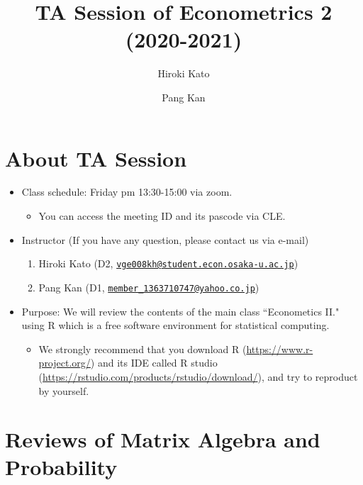 \documentclass[
  12pt,
]{article}
\title{TA Session of Econometrics 2 (2020-2021)}
\author{Hiroki Kato \and Pang Kan}
\date{}
\providecommand{\tightlist}{%
  \setlength{\itemsep}{0pt}\setlength{\parskip}{0pt}}
\begin{document}
\maketitle

{
\setcounter{tocdepth}{2}
\tableofcontents
}
\hypertarget{about-ta-session}{%
\section{About TA Session}\label{about-ta-session}}

\begin{itemize}
\tightlist
\item
  Class schedule: Friday pm 13:30-15:00 via zoom.

  \begin{itemize}
  \tightlist
  \item
    You can access the meeting ID and its pascode via CLE.
  \end{itemize}
\item
  Instructor (If you have any question, please contact us via e-mail)

  \begin{enumerate}
  \def\labelenumi{\arabic{enumi}.}
  \tightlist
  \item
    Hiroki Kato (D2, \href{mailto:vge008kh@student.econ.osaka-u.ac.jp}{\nolinkurl{vge008kh@student.econ.osaka-u.ac.jp}})
  \item
    Pang Kan (D1, \href{mailto:member_1363710747@yahoo.co.jp}{\nolinkurl{member\_1363710747@yahoo.co.jp}})
  \end{enumerate}
\item
  Purpose: We will review the contents of the main class ``Econometics II." using R which is a free software environment for statistical computing.

  \begin{itemize}
  \tightlist
  \item
    We strongly recommend that you download R (\url{https://www.r-project.org/}) and its IDE called R studio (\url{https://rstudio.com/products/rstudio/download/}), and try to reproduct by yourself.
  \end{itemize}
\end{itemize}

\hypertarget{reviews-of-matrix-algebra-and-probability}{%
\section{Reviews of Matrix Algebra and Probability}\label{reviews-of-matrix-algebra-and-probability}}
\end{document}
